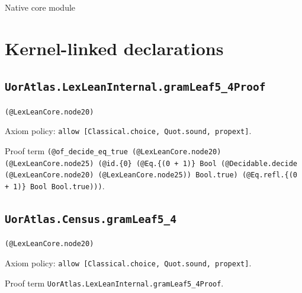 \documentclass[11pt]{article}
\begin{document}
\begin{center}{\LARGE Native core module}\end{center}
\section*{Kernel-linked declarations}
\subsection*{\texttt{UorAtlas.LexLeanInternal.gramLeaf5\_4Proof}}
\noindent\texttt{(@LexLeanCore.node20)}\par
\noindent Axiom policy: \texttt{allow [Classical.choice, Quot.sound, propext]}.\par
\noindent Proof term \texttt{(@of\_decide\_eq\_true (@LexLeanCore.node20) (@LexLeanCore.node25) (@id.\{0\} (@Eq.\{(0 + 1)\} Bool (@Decidable.decide (@LexLeanCore.node20) (@LexLeanCore.node25)) Bool.true) (@Eq.refl.\{(0 + 1)\} Bool Bool.true)))}.\par
\subsection*{\texttt{UorAtlas.Census.gramLeaf5\_4}}
\noindent\texttt{(@LexLeanCore.node20)}\par
\noindent Axiom policy: \texttt{allow [Classical.choice, Quot.sound, propext]}.\par
\noindent Proof term \texttt{UorAtlas.LexLeanInternal.gramLeaf5\_4Proof}.\par
\end{document}
